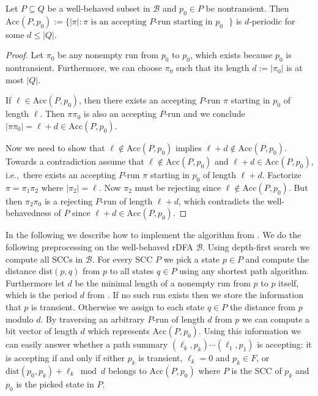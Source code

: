 \documentclass{theoretics}
\newcommand{\B}{\mathcal{B}}
\renewcommand{\leq}{\leqslant}
\renewcommand{\le}{\leq}
\begin{document}
\begin{lemma}
	\label{lem:wb-period}
	Let $P \subseteq Q$ be a well-behaved subset in $\B$ and $p_0 \in P$ be nontransient.
	Then $\mathrm{Acc}(P,p_0) := \{ |\pi| : \pi \text{ is an accepting $P$-run starting in $p_0$ } \}$
	is $d$-periodic for some $d \le |Q|$.
\end{lemma}

\begin{proof}
	Let $\pi_0$ be any nonempty run from $p_0$ to $p_0$, which exists because $p_0$ is nontransient.
	Furthermore, we can choose $\pi_0$ such that its length $d := |\pi_0|$ is at most $|Q|$.
	
	If $\ell \in \mathrm{Acc}(P,p_0)$, then there exists an accepting $P$-run $\pi$ starting in $p_0$
	of length $\ell$.
	Then $\pi \pi_0$ is also an accepting $P$-run
	and we conclude $|\pi\pi_0| = \ell + d \in \mathrm{Acc}(P,p_0)$.

	Now we need to show that $\ell \notin \mathrm{Acc}(P,p_0)$ implies $\ell + d \notin \mathrm{Acc}(P,p_0)$.
	Towards a contradiction assume that $\ell \notin \mathrm{Acc}(P,p_0)$
	and $\ell + d \in \mathrm{Acc}(P,p_0)$,
	i.e.,~there exists an accepting $P$-run $\pi$ starting in $p_0$ of length $\ell+d$.
	Factorize $\pi = \pi_1 \pi_2$ where $|\pi_2| = \ell$.
	Now $\pi_2$ must be rejecting since $\ell \notin \mathrm{Acc}(P,p_0)$.
	But then $\pi_2 \pi_0$ is a rejecting $P$-run of length $\ell+d$,
	which contradicts the well-behavedness of $P$ since $\ell + d \in \mathrm{Acc}(P,p_0)$.
\end{proof}

In the following we describe how to implement the algorithm from .
We do the following preprocessing on the well-behaved rDFA $\B$.
Using depth-first search we compute all SCCs in $\B$.
For every SCC $P$ we pick a state $p \in P$ and compute the distance
$\mathrm{dist}(p,q)$ from $p$ to all states $q \in P$ using any shortest path algorithm.
Furthermore let $d$ be the minimal length of a nonempty run from $p$ to $p$ itself,
which is the period $d$ from .
If no such run exists then we store the information that $p$ is transient.
Otherwise we assign to each state $q \in P$ the distance from $p$ modulo $d$.
By traversing an arbitrary $P$-run of length $d$ from $p$ we can compute a bit vector of length $d$
which represents $\mathrm{Acc}(P,p_0)$.
Using this information we can easily answer whether a path summary $(\ell_k,p_k) \cdots (\ell_1,p_1)$ is accepting:
it is accepting if and only if
either $p_k$ is transient, $\ell_k = 0$ and $p_k \in F$,
or $\mathrm{dist}(p_0,p_k) + \ell_k \bmod d$ belongs to $\mathrm{Acc}(P,p_0)$
where $P$ is the SCC of $p_k$ and $p_0$ is the picked state in $P$.
\end{document}
